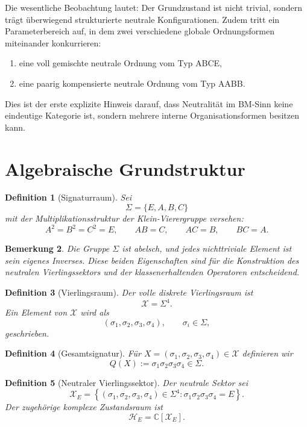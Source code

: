 \documentclass[11pt,a4paper]{article}
\newtheorem{definition}{Definition}[section]
\newtheorem{remark}[definition]{Bemerkung}
\newcommand{\X}{\mathcal X}
\newcommand{\HE}{\mathcal H_E}
\begin{document}
	Die wesentliche Beobachtung lautet: Der Grundzustand ist nicht trivial, sondern trägt überwiegend strukturierte neutrale Konfigurationen. Zudem tritt ein Parameterbereich auf, in dem zwei verschiedene globale Ordnungsformen miteinander konkurrieren:
	\begin{enumerate}[label=(\roman*)]
		\item eine voll gemischte neutrale Ordnung vom Typ ABCE,
		\item eine paarig kompensierte neutrale Ordnung vom Typ AABB.
	\end{enumerate}
	Dies ist der erste explizite Hinweis darauf, dass Neutralität im BM-Sinn keine eindeutige Kategorie ist, sondern mehrere interne Organisationsformen besitzen kann.
	
	\section{Algebraische Grundstruktur}
	
	\begin{definition}[Signaturraum]
		Sei
		\[
		\Sigma=\{E,A,B,C\}
		\]
		mit der Multiplikationsstruktur der Klein-Vierergruppe versehen:
		\[
		A^2=B^2=C^2=E,\qquad AB=C,\qquad AC=B,\qquad BC=A.
		\]
	\end{definition}
	
	\begin{remark}
		Die Gruppe \(\Sigma\) ist abelsch, und jedes nichttriviale Element ist sein eigenes Inverses. Diese beiden Eigenschaften sind für die Konstruktion des neutralen Vierlingssektors und der klassenerhaltenden Operatoren entscheidend.
	\end{remark}
	
	\begin{definition}[Vierlingsraum]
		Der volle diskrete Vierlingsraum ist
		\[
		\X=\Sigma^4.
		\]
		Ein Element von \(\X\) wird als
		\[
		(\sigma_1,\sigma_2,\sigma_3,\sigma_4),\qquad \sigma_i\in\Sigma,
		\]
		geschrieben.
	\end{definition}
	
	\begin{definition}[Gesamtsignatur]
		Für \(X=(\sigma_1,\sigma_2,\sigma_3,\sigma_4)\in\X\) definieren wir
		\[
		Q(X):=\sigma_1\sigma_2\sigma_3\sigma_4\in\Sigma.
		\]
	\end{definition}
	
	\begin{definition}[Neutraler Vierlingssektor]
		Der neutrale Sektor sei
		\[
		\X_E=\left\{(\sigma_1,\sigma_2,\sigma_3,\sigma_4)\in\Sigma^4:\sigma_1\sigma_2\sigma_3\sigma_4=E\right\}.
		\]
		Der zugehörige komplexe Zustandsraum ist
		\[
		\HE=\mathbb C[\X_E].
		\]
	\end{definition}
	
\end{document}
